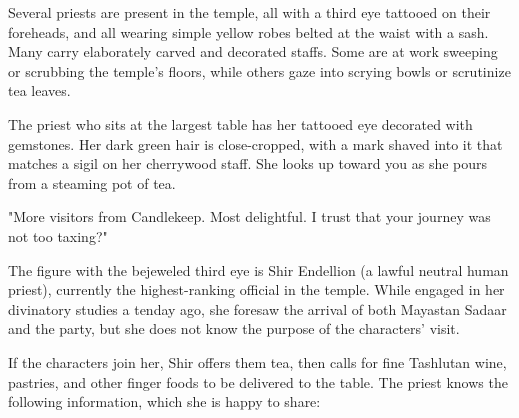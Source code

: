 \documentclass[10pt,a4paper,twoside,bg=print,twocolumn,openany,nodeprecatedcode]{dndbook}
\begin{document}
\begin{DndReadAloud}{}
Several priests are present in the temple, all with a third eye tattooed on their foreheads, and all wearing simple yellow robes belted at the waist with a sash. Many carry elaborately carved and decorated staffs. Some are at work sweeping or scrubbing the temple's floors, while others gaze into scrying bowls or scrutinize tea leaves.

The priest who sits at the largest table has her tattooed eye decorated with gemstones. Her dark green hair is close-cropped, with a mark shaved into it that matches a sigil on her cherrywood staff. She looks up toward you as she pours from a steaming pot of tea.

"More visitors from Candlekeep. Most delightful. I trust that your journey was not too taxing?"

\end{DndReadAloud}

The figure with the bejeweled third eye is Shir Endellion (a lawful neutral human priest), currently the highest-ranking official in the temple. While engaged in her divinatory studies a tenday ago, she foresaw the arrival of both Mayastan Sadaar and the party, but she does not know the purpose of the characters' visit.

If the characters join her, Shir offers them tea, then calls for fine Tashlutan wine, pastries, and other finger foods to be delivered to the table. The priest knows the following information, which she is happy to share:
\end{document}
